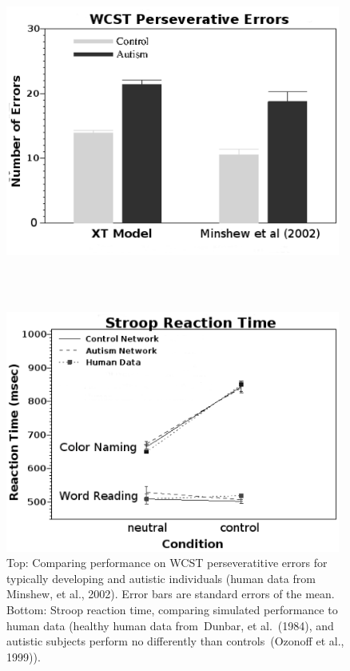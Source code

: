 \begin{figure}
\begin{center}
	\includegraphics[width=110mm]{graphs/wcst.ps}
                                                                
\textcolor{white}{\\--------------------------------\\}

	\includegraphics[width=110mm]{graphs/stroop.ps}
\end{center}
\caption{Top: Comparing performance on WCST perseveratitive errors for typically developing and autistic individuals (human data from Minshew, et al., 2002). Error bars are standard errors of the mean. Bottom: Stroop reaction time, comparing simulated performance to human data (healthy human data from~Dunbar, et al.~(1984), and autistic subjects perform no differently than controls~(Ozonoff et al., 1999)).} 
\label{ed-results-figure}
\end{figure} 

